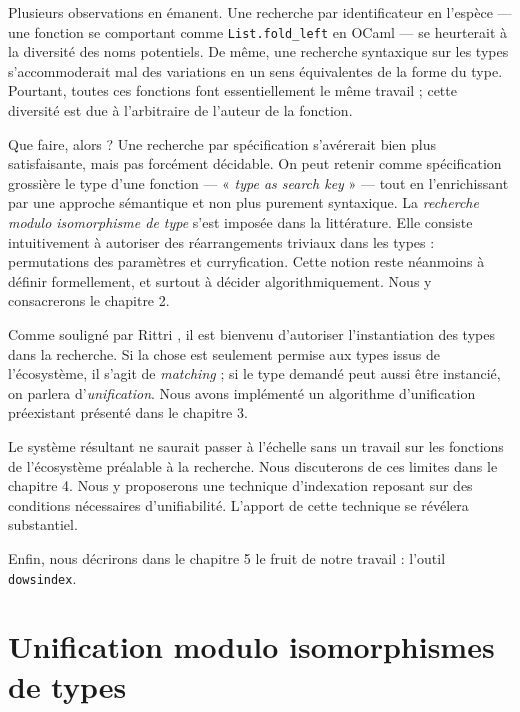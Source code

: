 \documentclass[a4paper]{report}
\theoremstyle{definition}
\newcommand{\dowsindex}{\texttt{dowsindex}\xspace}
\begin{document}
Plusieurs observations en émanent. Une recherche par identificateur en l'espèce — une fonction se comportant comme \texttt{List.fold\_left} en OCaml — se heurterait à la diversité des noms potentiels. De même, une recherche syntaxique sur les types s'accommoderait mal des variations en un sens équivalentes de la forme du type. Pourtant, toutes ces fonctions font essentiellement le même travail ; cette diversité est due à l'arbitraire de l'auteur de la fonction.

Que faire, alors ? Une recherche par spécification s'avérerait bien plus satisfaisante, mais pas forcément décidable. On peut retenir comme spécification grossière le type d'une fonction — « \textit{type as search key} » — tout en l'enrichissant par une approche sémantique et non plus purement syntaxique. La \textit{recherche modulo isomorphisme de type} s'est imposée dans la littérature. Elle consiste intuitivement à autoriser des réarrangements triviaux dans les types : permutations des paramètres et curryfication. Cette notion reste néanmoins à définir formellement, et surtout à décider algorithmiquement. Nous y consacrerons le chapitre 2.

Comme souligné par Rittri \cite{Rittri93}, il est bienvenu d'autoriser l'instantiation des types dans la recherche. Si la chose est seulement permise aux types issus de l'écosystème, il s'agit de \emph{matching} ; si le type demandé peut aussi être instancié, on parlera d'\emph{unification}. Nous avons implémenté un algorithme d'unification préexistant \cite{Boudet} présenté dans le chapitre 3.

Le système résultant ne saurait passer à l'échelle sans un travail sur les fonctions de l'écosystème préalable à la recherche. Nous discuterons de ces limites dans le chapitre 4. Nous y proposerons une technique d'indexation reposant sur des conditions nécessaires d'unifiabilité. L'apport de cette technique se révélera substantiel.

Enfin, nous décrirons dans le chapitre 5 le fruit de notre travail : l'outil  \dowsindex.


\chapter{Unification modulo isomorphismes de types}
\end{document}
